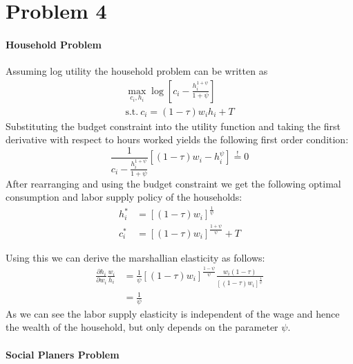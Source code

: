 
\section*{Problem 4}
\label{problem4}


\paragraph{Household Problem}

Assuming log utility the household problem can be written as
\begin{align*}
  \max_{c_i, h_i} \log \left[ c_i - \frac{h_i^{1 + \psi }}{1 + \psi } \right]
  \\
  \text{s.t.} ~ c_i = \left(1 - \tau\right) w_i h_i + T
\end{align*}
Substituting the budget constraint into the utility function and taking the
first derivative with respect to hours worked yields the following first order
condition:
\begin{equation*}
  \frac{1}{c_i - \frac{h_i^{1 + \psi }}{1 + \psi }} \left[ \left(1 - \tau
    \right) w_i - h_i^\psi \right] \overset{!}{=} 0 
\end{equation*}
After rearranging and using the budget constraint we get the following optimal
consumption and labor supply policy of the households:
\begin{align*}
  h_i^* &= \left[ \left(1 - \tau\right) w_i \right]^{\frac{1}{\psi }} \\
  c_i^* &= \left[ \left(1 - \tau\right) w_i \right]^{\frac{1 + \psi }{\psi }} + T
\end{align*}

Using this we can derive the marshallian elasticity as follows:
\begin{align*}
  \frac{\partial h_i}{\partial w_i} \frac{w_i}{h_i} &= \frac{1}{\psi }
  \left[\left(1 - \tau \right) w_i \right]^{\frac{1 - \psi}{\psi }} \frac{w_i
  \left(1 - \tau\right)}{\left[ \left(1 - \tau \right) w_i
  \right]^{\frac{1}{\psi }}} \\
  &= \frac{1}{\psi}
\end{align*}
As we can see the labor supply elasticity is independent of the wage and hence
the wealth of the household, but only depends on the parameter $\psi $.

\paragraph{Social Planers Problem}


